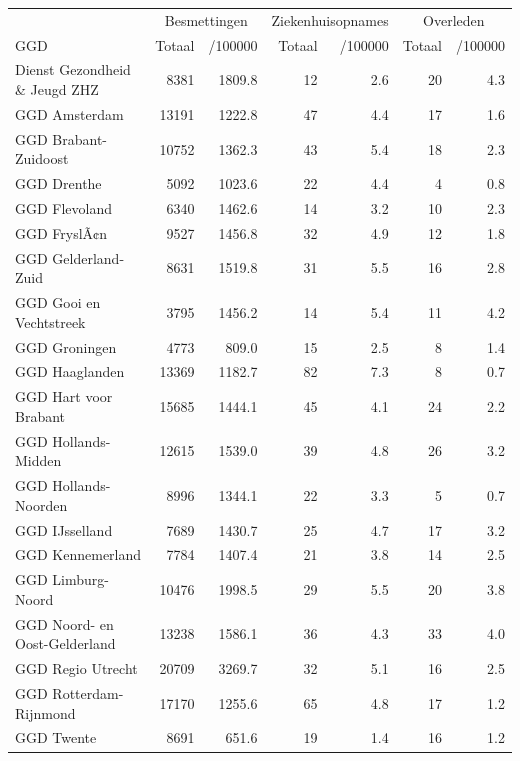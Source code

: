 \documentclass[
  english,
  man,floatsintext]{apa6}
\begin{document}
\begin{table}
\centering\begingroup\fontsize{10}{12}\selectfont

\begin{threeparttable}
\begin{tabular}{lrrrrrr}
\toprule
\multicolumn{1}{c}{ } & \multicolumn{2}{c}{Besmettingen} & \multicolumn{2}{c}{Ziekenhuisopnames} & \multicolumn{2}{c}{Overleden} \\
\cmidrule(l{3pt}r{3pt}){2-3} \cmidrule(l{3pt}r{3pt}){4-5} \cmidrule(l{3pt}r{3pt}){6-7}
GGD & Totaal & /100000 & Totaal & /100000 & Totaal & /100000\\
\midrule
Dienst Gezondheid \& Jeugd ZHZ & 8381 & 1809.8 & 12 & 2.6 & 20 & 4.3\\
GGD Amsterdam & 13191 & 1222.8 & 47 & 4.4 & 17 & 1.6\\
GGD Brabant-Zuidoost & 10752 & 1362.3 & 43 & 5.4 & 18 & 2.3\\
GGD Drenthe & 5092 & 1023.6 & 22 & 4.4 & 4 & 0.8\\
GGD Flevoland & 6340 & 1462.6 & 14 & 3.2 & 10 & 2.3\\
GGD FryslÃ¢n & 9527 & 1456.8 & 32 & 4.9 & 12 & 1.8\\
GGD Gelderland-Zuid & 8631 & 1519.8 & 31 & 5.5 & 16 & 2.8\\
GGD Gooi en Vechtstreek & 3795 & 1456.2 & 14 & 5.4 & 11 & 4.2\\
GGD Groningen & 4773 & 809.0 & 15 & 2.5 & 8 & 1.4\\
GGD Haaglanden & 13369 & 1182.7 & 82 & 7.3 & 8 & 0.7\\
GGD Hart voor Brabant & 15685 & 1444.1 & 45 & 4.1 & 24 & 2.2\\
GGD Hollands-Midden & 12615 & 1539.0 & 39 & 4.8 & 26 & 3.2\\
GGD Hollands-Noorden & 8996 & 1344.1 & 22 & 3.3 & 5 & 0.7\\
GGD IJsselland & 7689 & 1430.7 & 25 & 4.7 & 17 & 3.2\\
GGD Kennemerland & 7784 & 1407.4 & 21 & 3.8 & 14 & 2.5\\
GGD Limburg-Noord & 10476 & 1998.5 & 29 & 5.5 & 20 & 3.8\\
GGD Noord- en Oost-Gelderland & 13238 & 1586.1 & 36 & 4.3 & 33 & 4.0\\
GGD Regio Utrecht & 20709 & 3269.7 & 32 & 5.1 & 16 & 2.5\\
GGD Rotterdam-Rijnmond & 17170 & 1255.6 & 65 & 4.8 & 17 & 1.2\\
GGD Twente & 8691 & 651.6 & 19 & 1.4 & 16 & 1.2\\

\end{tabular}
\end{threeparttable}
\end{table}
\end{document}
